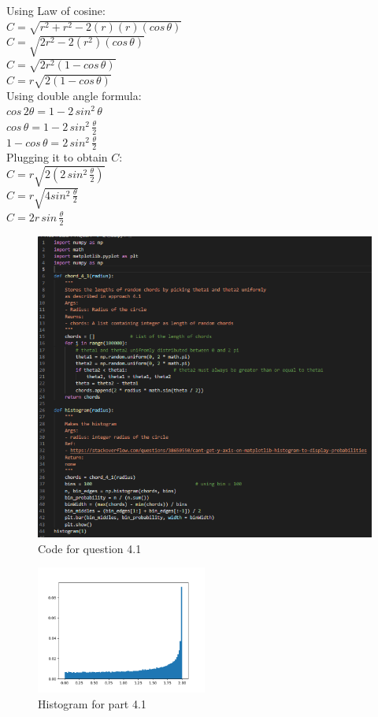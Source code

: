 \documentclass[answers]{exam}
\begin{document}
\begin{framed}
Using Law of cosine: \\
    $C = \sqrt{r^2 + r^2 - 2(r)(r)(cos \, \theta)}$\\
    $C = \sqrt{2r^2 - 2(r^2)(cos \, \theta)}$\\
    $C = \sqrt{2r^2 (1 - cos \, \theta)}$\\
    $C = r\sqrt{2(1 - cos \, \theta)}$\\
    Using double angle formula: \\$cos \, 2 \theta = 1 - 2 \, sin^2 \, \theta$\\
    $cos \, \theta = 1 - 2 \, sin^2 \, \frac{\theta}{2}$\\
    $1 - cos \, \theta = 2 \, sin^2 \, \frac{\theta}{2}$\\
    Plugging it to obtain $C$: \\
    $C = r \sqrt{2 (2 \, sin^2 \, \frac{\theta}{2})}$\\
    $C = r \sqrt{4 sin^2 \, \frac{\theta}{2}}$\\
    $C = 2r \, sin \, \frac{\theta}{2}$

\begin{figure}[H] %
    \centering
    \includegraphics[width= 1\textwidth]{Q4.1_code.PNG}
    \caption{Code for question 4.1}
\end{figure}

\begin{figure}[H] %
    \centering
    \includegraphics[width= 0.5\textwidth]{Q4.1_histogram.png}
    \caption{Histogram for part 4.1}
\end{figure}


\end{framed}
\end{document}
